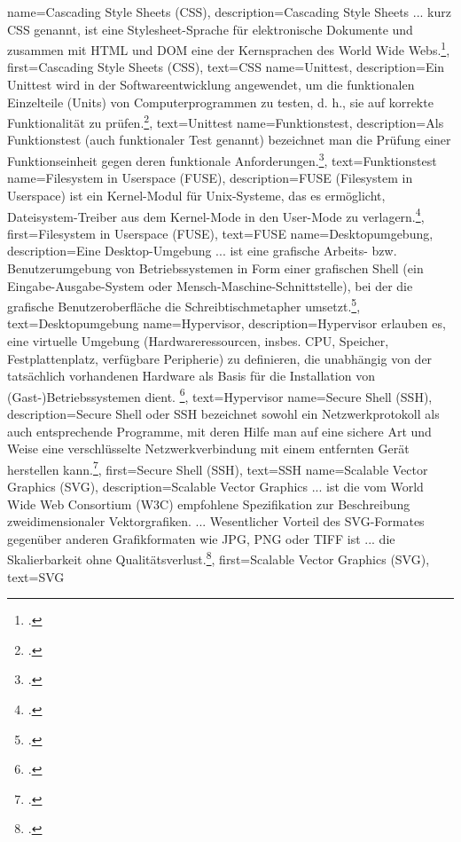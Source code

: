 {
    name={Cascading Style Sheets (CSS)},
    description={Cascading Style Sheets ... kurz CSS genannt, ist
      eine Stylesheet-Sprache für elektronische Dokumente und zusammen mit HTML und
      DOM eine der Kernsprachen des World Wide Webs.\footcite{css}},
    first={Cascading Style Sheets (CSS)},
    text={CSS}
}
{
    name={Unittest},
    description={Ein Unittest wird in der Softwareentwicklung angewendet, um
      die funktionalen Einzelteile (Units) von Computerprogrammen zu testen, d. h.,
      sie auf korrekte Funktionalität zu prüfen.\footcite{unittest}},
    text={Unittest}
}
{
    name={Funktionstest},
    description={Als Funktionstest (auch funktionaler Test genannt) bezeichnet
      man die Prüfung einer Funktionseinheit gegen deren funktionale
      Anforderungen.\footcite{funktionstest}},
    text={Funktionstest}
}
{
    name={Filesystem in Userspace (FUSE)},
    description={FUSE (Filesystem in Userspace) ist ein Kernel-Modul für
      Unix-Systeme, das es ermöglicht, Dateisystem-Treiber aus dem Kernel-Mode in den
      User-Mode zu verlagern.\footcite{fuse}},
    first={Filesystem in Userspace (FUSE)},
    text={FUSE}
}
{
    name={Desktopumgebung},
    description={Eine Desktop-Umgebung ... ist eine grafische Arbeits- bzw.
      Benutzerumgebung von Betriebssystemen in Form einer grafischen Shell (ein
      Eingabe-Ausgabe-System oder Mensch-Maschine-Schnittstelle), bei der die
      grafische Benutzeroberfläche die Schreibtischmetapher
      umsetzt.\footcite{desktopumgebung}},
    text={Desktopumgebung}
}
{
    name={Hypervisor},
    description={Hypervisor erlauben es, eine virtuelle Umgebung
      (Hardwareressourcen, insbes. CPU, Speicher, Festplattenplatz, verfügbare
      Peripherie) zu definieren, die unabhängig von der tatsächlich vorhandenen
      Hardware als Basis für die Installation von (Gast-)Betriebssystemen
      dient. \footcite{hypervisor}},
    text={Hypervisor}
}
{
    name={Secure Shell (SSH)},
    description={Secure Shell oder SSH bezeichnet sowohl ein Netzwerkprotokoll
      als auch entsprechende Programme, mit deren Hilfe man auf eine sichere Art und
      Weise eine verschlüsselte Netzwerkverbindung mit einem entfernten Gerät
      herstellen kann.\footcite{ssh}},
    first={Secure Shell (SSH)},
    text={SSH}
}
{
    name={Scalable Vector Graphics (SVG)},
    description={Scalable Vector Graphics ... ist die vom World Wide Web
      Consortium (W3C) empfohlene Spezifikation zur Beschreibung
      zweidimensionaler Vektorgrafiken. ... Wesentlicher Vorteil des
      SVG-Formates gegenüber anderen Grafikformaten wie JPG, PNG oder TIFF ist
      ... die Skalierbarkeit ohne Qualitätsverlust.\footcite{svg}},
    first={Scalable Vector Graphics (SVG)},
    text={SVG}
}
